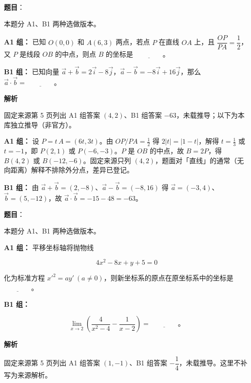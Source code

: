 \begin{answer}

\textbf{题目}：

本题分 A1、B1 两种选做版本。

\textbf{A1 组：} 已知 $O(0,0)$ 和 $A(6,3)$ 两点，若点 $P$ 在直线 $OA$ 上，且 $\dfrac{OP}{PA}=\dfrac12$，又 $P$ 是线段 $OB$ 的中点，则点 $B$ 的坐标是 $\underline{\qquad\qquad}$。

\textbf{B1 组：} 已知向量 $\vec a+\vec b=2\vec i-8\vec j$，$\vec a-\vec b=-8\vec i+16\vec j$，那么 $\vec a\cdot\vec b=\underline{\qquad\qquad}$。

\textbf{解析}

固定来源第 5 页列出 A1 组答案 $(4,2)$、B1 组答案 $-63$，未载推导；以下为本库独立推导（非官方）。

\textbf{A1 组：} 设 $P=t\,A=(6t,3t)$。由 $OP/PA=\tfrac12$ 得 $2|t|=|1-t|$，解得 $t=\tfrac13$ 或 $t=-1$，即 $P(2,1)$ 或 $P(-6,-3)$。$P$ 是 $OB$ 的中点，故 $B=2P$，得 $B(4,2)$ 或 $B(-12,-6)$。固定来源只列 $(4,2)$，题面对「直线」的通常（无向距离）解释不排除外分点，差异已登记。

\textbf{B1 组：} 由 $\vec a+\vec b=(2,-8)$、$\vec a-\vec b=(-8,16)$ 得 $\vec a=(-3,4)$、$\vec b=(5,-12)$，故 $\vec a\cdot\vec b=-15-48=-63$。


\end{answer}
\begin{answer}

\textbf{题目}：

本题分 A1、B1 两种选做版本。

\textbf{A1 组：} 平移坐标轴将抛物线

\nopagebreak[4]
\[
4x^2-8x+y+5=0
\]

化为标准方程 $x'^2=ay'\ (a\ne0)$，则新坐标系的原点在原坐标系中的坐标是 $\underline{\qquad\qquad}$。

\textbf{B1 组：}

\nopagebreak[4]
\[
\lim_{x\to2}\left(\dfrac{4}{x^2-4}-\dfrac{1}{x-2}\right)=\underline{\qquad\qquad}\mbox{。}
\]

\textbf{解析}

固定来源第 5 页列出 A1 组答案 $(1,-1)$、B1 组答案 $-\dfrac14$，未载推导。这里不补写为来源解析。


\end{answer}

